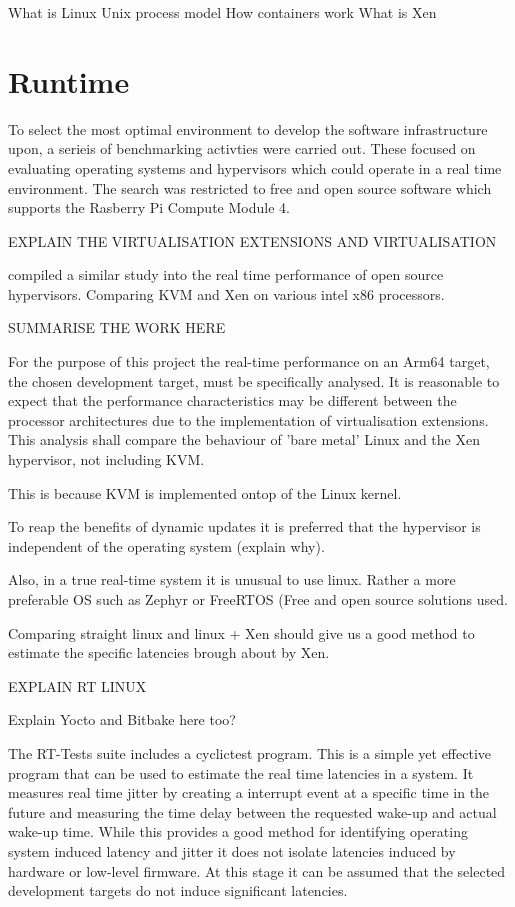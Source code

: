 \graphicspath{{main/runtime/graphics/}}

What is Linux
Unix process model
How containers work
What is Xen

\chapter{Runtime}

To select the most optimal environment to develop the software infrastructure upon, a serieis of benchmarking activties were carried out. These focused on evaluating operating systems and hypervisors which could operate in a real time environment. The search was restricted to free and open source software which supports the Rasberry Pi Compute Module 4.

EXPLAIN THE VIRTUALISATION EXTENSIONS AND VIRTUALISATION

\autocite{abeniUsingXenKVM2020} compiled a similar study into the real time performance of open source hypervisors. Comparing KVM and Xen on various intel x86 processors.

SUMMARISE THE WORK HERE

For the purpose of this project the real-time performance on an Arm64 target, the chosen development target, must be specifically analysed. It is reasonable to expect that the performance characteristics may be different between the processor architectures due to the implementation of virtualisation extensions. This analysis shall compare the behaviour of 'bare metal' Linux and the Xen hypervisor, not including KVM.

This is because KVM is implemented ontop of the Linux kernel.

To reap the benefits of dynamic updates it is preferred that the hypervisor is independent of the operating system (explain why).

Also, in a true real-time system it is unusual to use linux. Rather a more preferable OS such as Zephyr or FreeRTOS (Free and open source solutions used.

Comparing straight linux and linux +  Xen should give us a good method to estimate the specific latencies brough about by Xen.

EXPLAIN RT LINUX

Explain Yocto and Bitbake here too?

The RT-Tests suite includes a cyclictest program. This is a simple yet effective program that can be used to estimate the real time latencies in a system. It measures real time jitter by creating a interrupt event at a specific time in the future and measuring the time delay between the requested wake-up and actual wake-up time. While this provides a good method for identifying operating system induced latency and jitter it does not isolate latencies induced by hardware or low-level firmware. At this stage it can be assumed that the selected development targets do not induce significant latencies.

